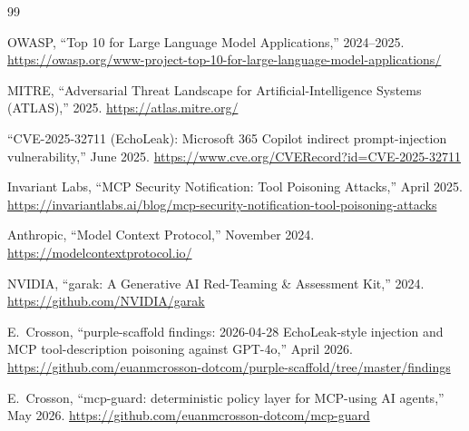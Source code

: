 \documentclass[10pt,conference]{IEEEtran}
\begin{document}
\begin{thebibliography}{99}

OWASP, ``Top 10 for Large Language Model Applications,''
2024--2025. \url{https://owasp.org/www-project-top-10-for-large-language-model-applications/}

MITRE, ``Adversarial Threat Landscape for Artificial-Intelligence
Systems (ATLAS),'' 2025. \url{https://atlas.mitre.org/}

``CVE-2025-32711 (EchoLeak): Microsoft 365 Copilot indirect
prompt-injection vulnerability,'' June 2025.
\url{https://www.cve.org/CVERecord?id=CVE-2025-32711}

Invariant Labs, ``MCP Security Notification: Tool Poisoning
Attacks,'' April 2025.
\url{https://invariantlabs.ai/blog/mcp-security-notification-tool-poisoning-attacks}

Anthropic, ``Model Context Protocol,'' November 2024.
\url{https://modelcontextprotocol.io/}

NVIDIA, ``garak: A Generative AI Red-Teaming \& Assessment Kit,''
2024. \url{https://github.com/NVIDIA/garak}

E.~Crosson, ``purple-scaffold findings: 2026-04-28
EchoLeak-style injection and MCP tool-description poisoning
against GPT-4o,'' April 2026.
\url{https://github.com/euanmcrosson-dotcom/purple-scaffold/tree/master/findings}

E.~Crosson, ``mcp-guard: deterministic policy layer for
MCP-using AI agents,'' May 2026.
\url{https://github.com/euanmcrosson-dotcom/mcp-guard}

\end{thebibliography}
\end{document}

